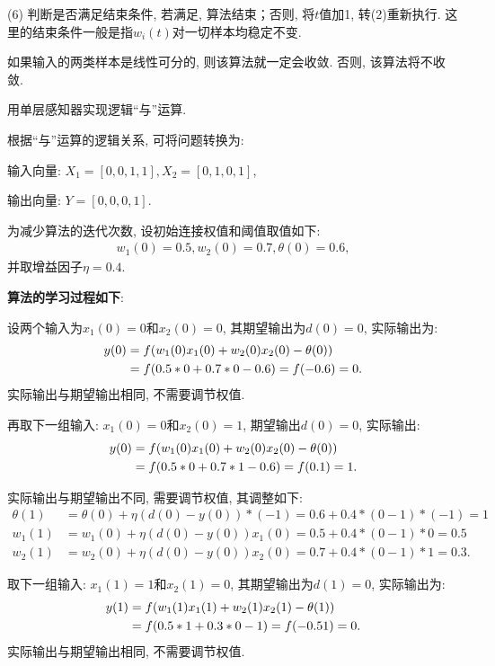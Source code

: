      (6) 判断是否满足结束条件, 若满足, 算法结束；否则, 将$t$值加1, 转(2)重新执行. 这里的结束条件一般是指$w_i(t)$对一切样本均稳定不变.

    如果输入的两类样本是线性可分的, 则该算法就一定会收敛. 否则, 该算法将不收敛.
\begin{example}
  用单层感知器实现逻辑“与”运算.
\end{example}
\begin{result}
根据“与”运算的逻辑关系, 可将问题转换为:

输入向量: $X_1=[0, 0, 1, 1],X_2=[0, 1, 0, 1]$,

输出向量: $Y=[0, 0, 0, 1]$.

为减少算法的迭代次数, 设初始连接权值和阈值取值如下:
\begin{align}
  w_1(0)=0.5,   w_2(0)=0.7,   \theta(0)=0.6,
\end{align}
并取增益因子$\eta=0.4$.
\end{result}

\textbf{算法的学习过程如下}:

设两个输入为$x_1(0)=0$和$x_2(0)=0$, 其期望输出为$d(0)=0$, 实际输出为:
\begin{align}
y(0)&=f(w_1(0)x_1(0)+ w_2(0)x_2(0)-\theta(0))\notag\\
    &=f(0.5*0+0.7*0-0.6)=f(-0.6)=0.
\end{align}
实际输出与期望输出相同, 不需要调节权值.

再取下一组输入: $x_1(0)=0$和$x_2(0)=1$,  期望输出$d(0)=0$, 实际输出:
\begin{align}
y(0)&=f(w_1(0) x_1(0)+ w_2(0) x_2(0)-\theta(0))\notag\\
    &=f(0.5*0+0.7*1-0.6)=f(0.1)=1.
\end{align}

实际输出与期望输出不同, 需要调节权值, 其调整如下:
\begin{align}
\theta(1)&=\theta(0)+\eta (d(0)- y(0))*(-1)=0.6+0.4*(0-1)*(-1)=1\\
w_1(1)&=w_1(0)+\eta (d(0)- y(0))x_1(0)=0.5+0.4*(0-1)*0=0.5\\
w_2(1)&=w_2(0)+\eta (d(0)- y(0))x_2(0)=0.7+0.4*(0-1)*1=0.3.
\end{align}

取下一组输入: $x_1(1)=1$和$x_2(1)=0$, 其期望输出为$d(1)=0$, 实际输出为:
\begin{align}
y(1)&=f(w_1(1) x_1(1)+ w_2(1) x_2(1)-\theta(1))\notag\\
    &=f(0.5*1+0.3*0-1)=f(-0.51)=0.
\end{align}
实际输出与期望输出相同, 不需要调节权值.

